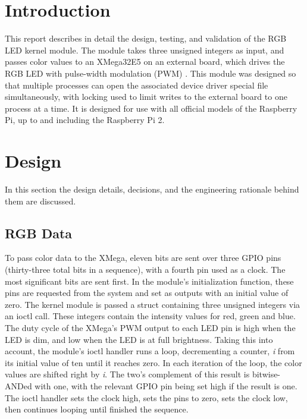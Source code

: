 \documentclass[10pt]{article}
\begin{document}

\Large{}

\large
\section{Introduction}

\noindent This report describes in detail the design, testing, and validation of the RGB LED kernel module. The module takes three unsigned integers as input, and passes color values to an XMega32E5 on an external board, which drives the RGB LED with pulse-width modulation (PWM) . This module was designed so that multiple processes can open the associated device driver special file simultaneously, with locking used to limit writes to the external board to one process at a time. It is designed for use with all official models of the Raspberry Pi, up to and including the Raspberry Pi 2. 


\section{Design}
In this section the design details, decisions, and the engineering rationale behind them are discussed.
\subsection{RGB Data}
\noindent To pass color data to the XMega, eleven bits are sent over three GPIO pins (thirty-three total bits in a sequence), with a fourth pin used as a clock. The most significant bits are sent first. In the module's initialization function, these pins are requested from the system and set as outputs with an initial value of zero. The kernel module is passed a struct containing three unsigned integers via an ioctl call. These integers contain the intensity values for red, green and blue. The duty cycle of the XMega's PWM output to each LED pin is high when the LED is dim, and low when the LED is at full brightness. Taking this into account, the module's ioctl handler runs a loop, decrementing a counter, \emph{i} from its initial value of ten until it reaches zero. In each iteration of the loop, the color values are shifted right by \emph{i}. The two's complement of this result is bitwise-ANDed with one, with the relevant GPIO pin being set high if the result is one. The ioctl handler sets the clock high, sets the pins to zero, sets the clock low, then continues looping until finished the sequence.
\end{document}
